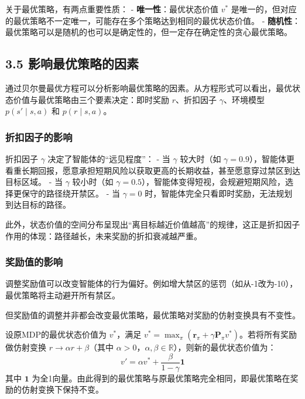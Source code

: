 \documentclass[UTF8]{article}
\begin{document}
关于最优策略，有两点重要性质：
- \textbf{唯一性}：最优状态价值 $v^*$ 是唯一的，但对应的最优策略不一定唯一，可能存在多个策略达到相同的最优状态价值。
- \textbf{随机性}：最优策略可以是随机的也可以是确定性的，但一定存在确定性的贪心最优策略。

\subsection*{3.5 影响最优策略的因素}

通过贝尔曼最优方程可以分析影响最优策略的因素。从方程形式可以看出，最优状态价值与最优策略由三个要素决定：即时奖励 $r$、折扣因子 $\gamma$、环境模型 $p(s' \mid s,a)$ 和 $p(r \mid s,a)$。

\subsubsection*{折扣因子的影响}

折扣因子 $\gamma$ 决定了智能体的“远见程度”：
- 当 $\gamma$ 较大时（如 $\gamma=0.9$），智能体更看重长期回报，愿意承担短期风险以获取更高的长期收益，甚至愿意穿过禁区到达目标区域。
- 当 $\gamma$ 较小时（如 $\gamma=0.5$），智能体变得短视，会规避短期风险，选择更保守的路径绕开禁区。
- 当 $\gamma=0$ 时，智能体完全只看即时奖励，无法规划到达目标的路径。

此外，状态价值的空间分布呈现出“离目标越近价值越高”的规律，这正是折扣因子作用的体现：路径越长，未来奖励的折扣衰减越严重。

\subsubsection*{奖励值的影响}

调整奖励值可以改变智能体的行为偏好。例如增大禁区的惩罚（如从-1改为-10），最优策略将主动避开所有禁区。

但奖励值的调整并非都会改变最优策略，最优策略对奖励的仿射变换具有不变性。

\begin{theorembox}[3.6 最优策略不变性]
    设原MDP的最优状态价值为 $v^*$，满足 $v^* = \max_\pi (\boldsymbol{r}_\pi + \gamma \boldsymbol{P}_\pi v^*)$。若将所有奖励做仿射变换 $r \to \alpha r + \beta$（其中 $\alpha > 0$，$\alpha, \beta \in \mathbb{R}$），则新的最优状态价值为：
    \begin{equation}
    v' = \alpha v^* + \frac{\beta}{1-\gamma} \boldsymbol{1}
    \end{equation}
    其中 $\boldsymbol{1}$ 为全1向量。由此得到的最优策略与原最优策略完全相同，即最优策略在奖励的仿射变换下保持不变。
\end{theorembox}
\end{document}
